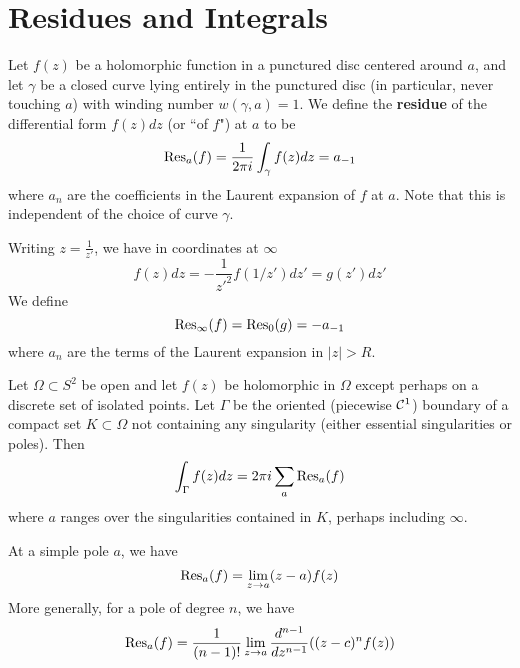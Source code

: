 \documentclass{article}
\begin{document}
\section{Residues and Integrals}

\begin{definition}[Residue]
Let \(f(z)\) be a holomorphic function in a punctured disc centered around \(a\), and let \(\gamma\) be a closed curve lying entirely in the punctured disc (in particular, never touching \(a\)) with winding number \(w(\gamma, a) = 1\). We define the \textbf{residue} of the differential form \(f(z)dz\) (or ``of \(f\)") at \(a\) to be
\begin{equation}
  \operatorname{Res}_a(f) = \frac{1}{2\pi i}\int_\gamma f(z)dz = a_{-1}
\end{equation}
where \(a_n\) are the coefficients in the Laurent expansion of \(f\) at \(a\). Note that this is independent of the choice of curve \(\gamma\).
\end{definition}

\begin{definition}
  Writing \(z = \frac{1}{z'}\), we have in coordinates at \(\infty\)
  \begin{equation}
    f(z)dz = -\frac{1}{z'^2}f(1/z')dz' = g(z')dz'
  \end{equation}
  We define
  \begin{equation}
    \operatorname{Res}_\infty(f) = \operatorname{Res}_0(g) = -a_{-1}
  \end{equation}
  where \(a_n\) are the terms of the Laurent expansion in \(|z| > R\).
\end{definition}

\begin{theorem}
  Let \(\Omega \subset S^2\) be open and let \(f(z)\) be holomorphic in \(\Omega\) except perhaps on a discrete set of isolated points. Let \(\Gamma\) be the oriented (piecewise \(\mathcal{C}^1\)) boundary of a compact set \(K \subset \Omega\) not containing any singularity (either essential singularities or poles). Then
  \begin{equation}
    \int_\Gamma f(z)dz = 2\pi i\sum_a\operatorname{Res}_a(f)
  \end{equation}
  where \(a\) ranges over the singularities contained in \(K\), perhaps including \(\infty\).
\end{theorem}

At a simple pole \(a\), we have
\begin{equation}
  \operatorname{Res}_a(f) = \lim_{z \to a}(z - a)f(z)
\end{equation}
More generally, for a pole of degree \(n\), we have
\begin{equation}
  \operatorname{Res}_a(f) = \frac{1}{(n - 1)!}\lim_{z \to a}\frac{d^{n - 1}}{dz^{n - 1}}((z - c)^nf(z))
\end{equation}
\end{document}
